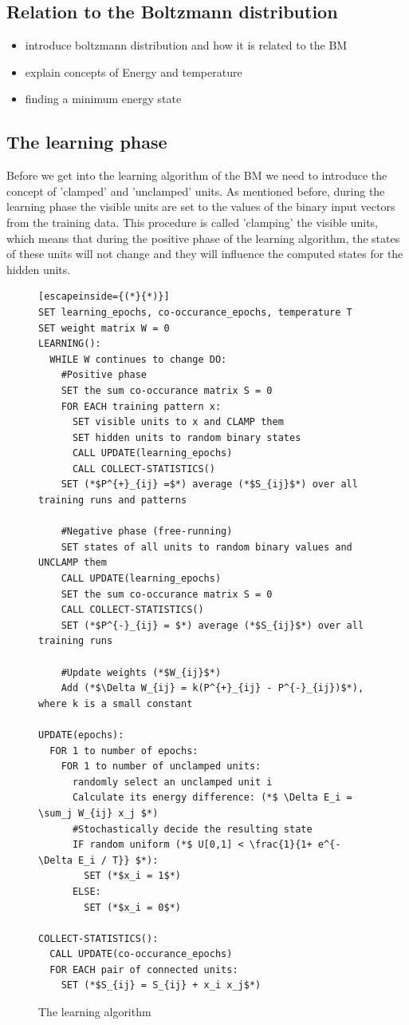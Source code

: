 \documentclass[12pt,twoside]{article}
\theoremstyle{plain}
\theoremstyle{definition}
\theoremstyle{remark}
\begin{document}
\subsection{Relation to the Boltzmann distribution}
\begin{itemize}
        \item introduce boltzmann distribution and how it is related to the BM
        \item explain concepts of Energy and temperature
        \item finding a minimum energy state
\end{itemize}

\subsection{The learning phase}
Before we get into the learning algorithm of the BM we need to introduce the concept of 'clamped' and 'unclamped' units.
As mentioned before, during the learning phase the visible units are set to the values of the binary input vectors from the training data.
This procedure is called 'clamping' the visible units, which means that during the positive phase of the learning
algorithm, the states of these units will not change and they will influence the computed states for the hidden units.

\begin{figure}[h]
\begin{lstlisting}[escapeinside={(*}{*)}]
SET learning_epochs, co-occurance_epochs, temperature T
SET weight matrix W = 0
LEARNING():
  WHILE W continues to change DO:
    #Positive phase
    SET the sum co-occurance matrix S = 0
    FOR EACH training pattern x:
      SET visible units to x and CLAMP them
      SET hidden units to random binary states
      CALL UPDATE(learning_epochs)
      CALL COLLECT-STATISTICS()
    SET (*$P^{+}_{ij} =$*) average (*$S_{ij}$*) over all training runs and patterns

    #Negative phase (free-running)
    SET states of all units to random binary values and UNCLAMP them
    CALL UPDATE(learning_epochs)
    SET the sum co-occurance matrix S = 0
    CALL COLLECT-STATISTICS()
    SET (*$P^{-}_{ij} = $*) average (*$S_{ij}$*) over all training runs

    #Update weights (*$W_{ij}$*)
    Add (*$\Delta W_{ij} = k(P^{+}_{ij} - P^{-}_{ij})$*), where k is a small constant

UPDATE(epochs):
  FOR 1 to number of epochs:
    FOR 1 to number of unclamped units:
      randomly select an unclamped unit i
      Calculate its energy difference: (*$ \Delta E_i = \sum_j W_{ij} x_j $*)
      #Stochastically decide the resulting state
      IF random uniform (*$ U[0,1] < \frac{1}{1+ e^{- \Delta E_i / T}} $*):
        SET (*$x_i = 1$*)
      ELSE:
        SET (*$x_i = 0$*)

COLLECT-STATISTICS():
  CALL UPDATE(co-occurance_epochs)
  FOR EACH pair of connected units:
    SET (*$S_{ij} = S_{ij} + x_i x_j$*)
\end{lstlisting}
\caption{The learning algorithm}
\label{fig:learning-alg}
\end{figure}
\end{document}
